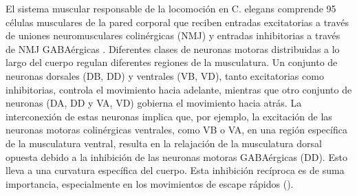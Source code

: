 El sistema muscular responsable de la locomoción en C. elegans comprende 95 células musculares de la pared corporal que reciben entradas excitatorias a través de uniones neuromusculares colinérgicas (NMJ) y entradas inhibitorias a través de NMJ GABAérgicas \cite{bono_neuronal_2005}. Diferentes clases de neuronas motoras distribuidas a lo largo del cuerpo regulan diferentes regiones de la musculatura. Un conjunto de neuronas dorsales (DB, DD) y ventrales (VB, VD), tanto excitatorias como inhibitorias, controla el movimiento hacia adelante, mientras que otro conjunto de neuronas (DA, DD y VA, VD) gobierna el movimiento hacia atrás. La interconexión de estas neuronas implica que, por ejemplo, la excitación de las neuronas motoras colinérgicas ventrales, como VB o VA, en una región específica de la musculatura ventral, resulta en la relajación de la musculatura dorsal opuesta debido a la inhibición de las neuronas motoras GABAérgicas (DD). Esto lleva a una curvatura específica del cuerpo. Esta inhibición recíproca es de suma importancia, especialmente en los movimientos de escape rápidos ().



